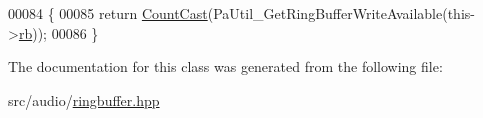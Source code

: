 \begin{DoxyCode}
00084     \{
00085         \textcolor{keywordflow}{return} \hyperlink{classRingBuffer_ae907c82ba714a087d9f35b089f9fbf77}{CountCast}(PaUtil\_GetRingBufferWriteAvailable(this->\hyperlink{classRingBuffer_a10985ec171bcc15c1301dc74fcb6e7b2}{rb}));
00086     \}
\end{DoxyCode}


The documentation for this class was generated from the following file\+:\begin{DoxyCompactItemize}
\item 
src/audio/\hyperlink{ringbuffer_8hpp}{ringbuffer.\+hpp}\end{DoxyCompactItemize}

